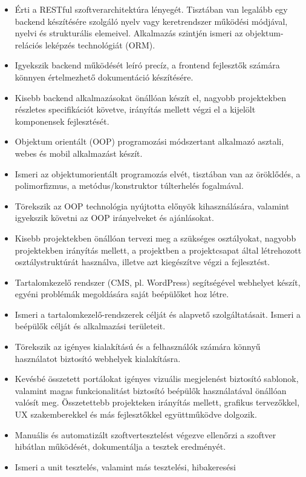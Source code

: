 \begin{itemize}
\item
  Érti a RESTful szoftverarchitektúra lényegét. Tisztában van legalább
  egy backend készítésére szolgáló nyelv vagy keretrendszer működési
  módjával, nyelvi és strukturális elemeivel. Alkalmazás szintjén ismeri
  az objektum-relációs leképzés technológiát (ORM).
\item
  Igyekszik backend működését leíró precíz, a frontend fejlesztők
  számára könnyen értelmezhető dokumentáció készítésére.
\item
  Kisebb backend alkalmazásokat önállóan készít el, nagyobb projektekben
  részletes specifikációt követve, irányítás mellett végzi el a kijelölt
  komponensek fejlesztését.
\item
  Objektum orientált (OOP) programozási módszertant alkalmazó asztali,
  webes és mobil alkalmazást készít.
\item
  Ismeri az objektumorientált programozás elvét, tisztában van az
  öröklődés, a polimorfizmus, a metódus/konstruktor túlterhelés
  fogalmával.
\item
  Törekszik az OOP technológia nyújtotta előnyök kihasználására,
  valamint igyekszik követni az OOP irányelveket és ajánlásokat.
\item
  Kisebb projektekben önállóan tervezi meg a szükséges osztályokat,
  nagyobb projektekben irányítás mellett, a projektben a projektcsapat
  által létrehozott osztálystruktúrát használva, illetve azt kiegészítve
  végzi a fejlesztést.
\item
  Tartalomkezelő rendszer (CMS, pl. WordPress) segítségével webhelyet
  készít, egyéni problémák megoldására saját beépülőket hoz létre.
\item
  Ismeri a tartalomkezelő-rendszerek célját és alapvető szolgáltatásait.
  Ismeri a beépülők célját és alkalmazási területeit.
\item
  Törekszik az igényes kialakítású és a felhasználók számára könnyű
  használatot biztosító webhelyek kialakításra.
\item
  Kevésbé összetett portálokat igényes vizuális megjelenést biztosító
  sablonok, valamint magas funkcionalitást biztosító beépülők
  használatával önállóan valósít meg. Összetettebb projekteken irányítás
  mellett, grafikus tervezőkkel, UX szakemberekkel és más fejlesztőkkel
  együttműködve dolgozik.
\item
  Manuális és automatizált szoftvertesztelést végezve ellenőrzi a
  szoftver hibátlan működését, dokumentálja a tesztek eredményét.
\item
  Ismeri a unit tesztelés, valamint más tesztelési, hibakeresési

\end{itemize}
